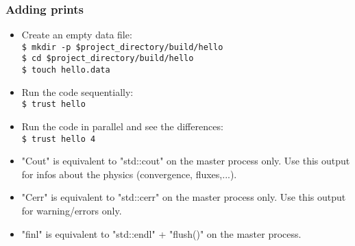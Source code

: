 \documentclass[10pt, hyperref={unicode=true,pdfusetitle, bookmarks=true,bookmarksnumbered=false,bookmarksopen=false, breaklinks=false,pdfborder={0 0 1},backref=true,colorlinks=true,linkcolor=darkblue,pageanchor, urlcolor=darkblue}]{beamer}
\begin{document}
\begin{frame}
\frametitle{Adding prints}
\begin{block}{}

\begin{itemize}
\item Create an empty data file:\\
\texttt{\$ mkdir -p \$project\_directory/build/hello}\\
\texttt{\$ cd \$project\_directory/build/hello}\\
\texttt{\$ touch hello.data}\\

\item Run the code sequentially:\\
\texttt{\$ trust hello}

\item Run the code in parallel and see the differences:\\
\texttt{\$ trust hello 4}

\item "Cout" is equivalent to "std::cout" on the master process only.
Use this output for infos about the physics (convergence, fluxes,...).

\item "Cerr" is equivalent to "std::cerr" on the master process only.
Use this output for warning/errors only.

\item "finl" is equivalent to "std::endl" + "flush()" on the master process.
\end{itemize}

\end{block}
\end{frame}
\end{document}
